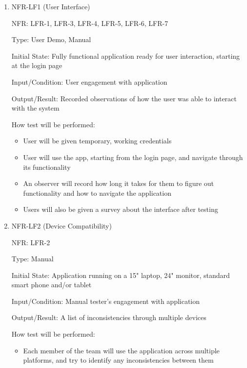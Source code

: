 \documentclass[12pt, titlepage]{article}
\begin{document}
\begin{enumerate}

\item{NFR-LF1 (User Interface)\\}

NFR: LFR-1, LFR-3, LFR-4, LFR-5, LFR-6, LFR-7

Type: User Demo, Manual

Initial State: Fully functional application ready for user interaction, starting
at the login page

Input/Condition: User engagement with application 

Output/Result: Recorded observations of how the user was able to interact with
the system 

How test will be performed: 
\begin{itemize}
  \item User will be given temporary, working credentials 
  \item User will use the app, starting from the login page, and navigate
  through its functionality
  \item An observer will record how long it takes for them to figure out
  functionality and how to navigate the application
  \item Users will also be given a survey about the interface after testing

\end{itemize}
					
\item{NFR-LF2 (Device Compatibility)\\}

NFR: LFR-2

Type: Manual

Initial State: Application running on a 15" laptop, 24" monitor, standard smart
phone and/or tablet

Input/Condition: Manual tester's engagement with application

Output/Result: A list of inconsistencies through multiple devices

How test will be performed: 
\begin{itemize}
  \item Each member of the team will use the application across multiple
  platforms, and try to identify any inconsistencies between them
\end{itemize}
\end{enumerate}
\end{document}
